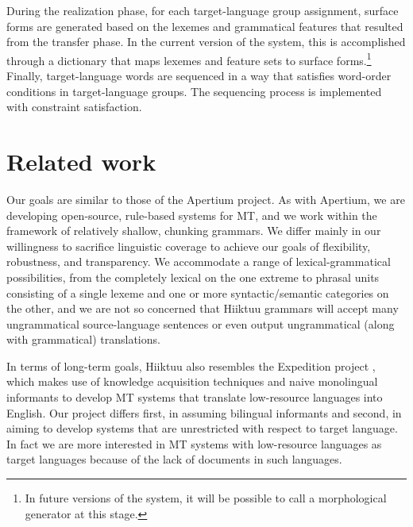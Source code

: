 \documentclass[11pt, a4paper]{article}
\begin{document}
During the realization phase, for each target-language group assignment,
surface forms are generated based on the lexemes and grammatical features that resulted from
the transfer phase.
In the current version of the system, this is accomplished through a dictionary that maps
lexemes and feature sets to surface forms.\footnote{In future versions
of the system, it will be possible to call a morphological generator at
this stage.}
Finally, target-language words are sequenced in a way that satisfies word-order
conditions in target-language groups.
The sequencing process is implemented with constraint satisfaction.

\section{Related work}
\label{sect:related}

Our goals are similar to those of the Apertium \cite{apertium} project.
As with Apertium, we are developing open-source, rule-based systems for MT, and
we work within the framework of relatively shallow, chunking grammars.
We differ mainly in our willingness to sacrifice linguistic coverage
to achieve our goals of flexibility, robustness, and transparency.
We accommodate a range of lexical-grammatical possibilities, from the completely
lexical on the one extreme to phrasal units consisting of a single lexeme and one or more syntactic/semantic
categories on the other, and we are not so concerned that Hiiktuu grammars will accept many ungrammatical source-language
sentences or even output ungrammatical (along with grammatical)
translations.

In terms of long-term goals, Hiiktuu also resembles the Expedition
project \cite{mcshane+nirenburg}, which makes use of knowledge acquisition
techniques and naive monolingual informants to develop
MT systems that translate low-resource languages into English.
Our project differs first, in assuming bilingual informants and second, in aiming to
develop systems that are unrestricted with respect to target language.
In fact we are more interested in MT systems with low-resource languages as target languages
because of the lack of documents in such languages.
\end{document}
